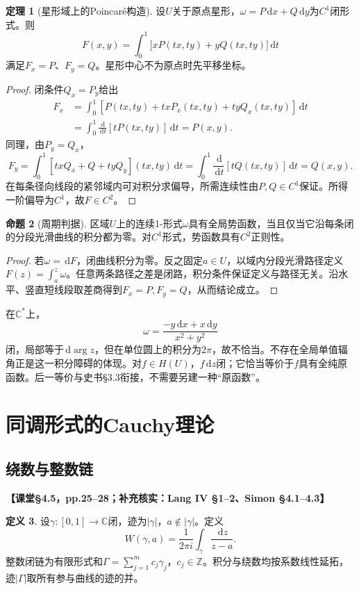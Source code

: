 \documentclass[11pt,a4paper,fontset=fandol]{ctexart}
\theoremstyle{definition}\newtheorem{theorem}{定理}[section]\newtheorem{proposition}[theorem]{命题}\newtheorem{definition}[theorem]{定义}
\newcommand{\C}{\mathbb C}\newcommand{\R}{\mathbb R}\newcommand{\Z}{\mathbb Z}\newcommand{\D}{\mathbb D}\newcommand{\dd}{\,\mathrm d}
\newcommand{\src}[1]{\par\noindent\textbf{【#1】}\par\nopagebreak}
\begin{document}
\begin{theorem}[星形域上的Poincaré构造]
设$U$关于原点星形，$\omega=P\dd x+Q\dd y$为$C^1$闭形式。则
\[F(x,y)=\int_0^1\big[xP(tx,ty)+yQ(tx,ty)\big]\dd t\]
满足$F_x=P$、$F_y=Q$。星形中心不为原点时先平移坐标。
\end{theorem}
\begin{proof}
闭条件$Q_x=P_y$给出
\begin{align*}
F_x&=\int_0^1[P(tx,ty)+txP_x(tx,ty)+tyQ_x(tx,ty)]\dd t\\
&=\int_0^1\frac{\dd}{\dd t}[tP(tx,ty)]\dd t=P(x,y).
\end{align*}
同理，由$P_y=Q_x$，
\[F_y=\int_0^1[txQ_x+Q+tyQ_y](tx,ty)\dd t
=\int_0^1\frac{\dd}{\dd t}[tQ(tx,ty)]\dd t=Q(x,y).\]
在每条径向线段的紧邻域内可对积分求偏导，所需连续性由$P,Q\in C^1$保证。所得一阶偏导为$C^1$，故$F\in C^2$。
\end{proof}

\begin{proposition}[周期判据]
区域$U$上的连续1-形式$\omega$具有全局势函数，当且仅当它沿每条闭的分段光滑曲线的积分都为零。对$C^1$形式，势函数具有$C^2$正则性。
\end{proposition}
\begin{proof}
若$\omega=\dd F$，闭曲线积分为零。反之固定$a\in U$，以域内分段光滑路径定义$F(z)=\int_a^z\omega$。任意两条路径之差是闭路，积分条件保证定义与路径无关。沿水平、竖直短线段取差商得到$F_x=P,F_y=Q$，从而结论成立。
\end{proof}

在$\C^*$上，
\[\omega=\frac{-y\dd x+x\dd y}{x^2+y^2}\]
闭，局部等于$\dd\arg z$，但在单位圆上的积分为$2\pi$，故不恰当。不存在全局单值辐角正是这一积分障碍的体现。对$f\in H(U)$，$f\dd z$闭；它恰当等价于$f$具有全纯原函数。后一等价与史书§3.3衔接，不需要另建一种“原函数”。

\section{同调形式的Cauchy理论}
\subsection{绕数与整数链}
\src{课堂§4.5，pp.25--28；补充核实：Lang IV §1--2、Simon §4.1--4.3}
\begin{definition}
设$\gamma:[0,1]\to\C$闭，迹为$|\gamma|$，$a\notin|\gamma|$。定义
\[W(\gamma,a)=\frac1{2\pi i}\int_\gamma\frac{\dd z}{z-a}.\]
整数闭链为有限形式和$\Gamma=\sum_{j=1}^mc_j\gamma_j$，$c_j\in\Z$。积分与绕数均按系数线性延拓，迹$|\Gamma|$取所有参与曲线的迹的并。
\end{definition}
\end{document}
